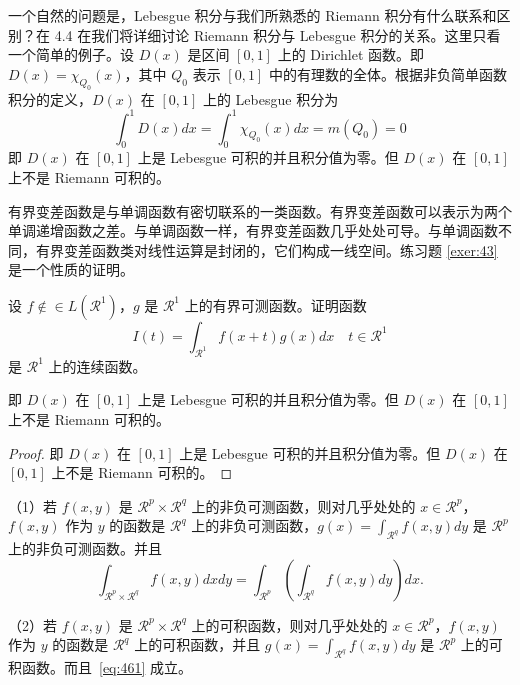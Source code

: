 \documentclass[lang=cn,newtx,10pt,scheme=chinese]{elegantbook}
\begin{document}
一个自然的问题是，Lebesgue 积分与我们所熟悉的 Riemann 积分有什么联系和区别？在 4.4 在我们将详细讨论 Riemann 积分与 Lebesgue 积分的关系。这里只看一个简单的例子。设 $D(x)$ 是区间 $[0,1]$ 上的 Dirichlet 函数。即 $D(x)=\chi_{Q_0}(x)$，其中 $Q_0$ 表示 $[0,1]$ 中的有理数的全体。根据非负简单函数积分的定义，$D(x)$ 在 $[0,1]$ 上的 Lebesgue 积分为
\begin{equation}
   \label{inter2}
   \int_0^1 D(x)dx = \int_0^1 \chi_{Q_0} (x) dx = m(Q_0) = 0
\end{equation}
即 $D(x)$ 在 $[0,1]$ 上是 Lebesgue 可积的并且积分值为零。但 $D(x)$ 在 $[0,1]$ 上不是 Riemann 可积的。


有界变差函数是与单调函数有密切联系的一类函数。有界变差函数可以表示为两个单调递增函数之差。与单调函数一样，有界变差函数几乎处处可导。与单调函数不同，有界变差函数类对线性运算是封闭的，它们构成一线空间。练习题 \ref{exer:43} 是一个性质的证明。

\begin{exercise}\label{exer:43}
设 $f \notin\in L(\mathcal{R}^1)$，$g$ 是 $\mathcal{R}^1$ 上的有界可测函数。证明函数
\begin{equation}
   \label{ex:1}
   I(t) = \int_{\mathcal{R}^1} f(x+t)g(x)dx \quad t \in \mathcal{R}^1
\end{equation}
是 $\mathcal{R}^1$ 上的连续函数。 
\end{exercise}

\begin{solution}
即 $D(x)$ 在 $[0,1]$ 上是 Lebesgue 可积的并且积分值为零。但 $D(x)$ 在 $[0,1]$ 上不是 Riemann 可积的。
\end{solution}

\begin{proof}
即 $D(x)$ 在 $[0,1]$ 上是 Lebesgue 可积的并且积分值为零。但 $D(x)$ 在 $[0,1]$ 上不是 Riemann 可积的。
\end{proof}

\begin{theorem}[Fubini 定理] \label{thm:fubi} 
（1）若 $f(x,y)$ 是 $\mathcal{R}^p\times\mathcal{R}^q$ 上的非负可测函数，则对几乎处处的 $x\in \mathcal{R}^p$，$f(x,y)$ 作为 $y$ 的函数是 $\mathcal{R}^q$ 上的非负可测函数，$g(x)=\int_{\mathcal{R}^q}f(x,y) dy$ 是 $\mathcal{R}^p$ 上的非负可测函数。并且
\begin{equation}
   \label{eq:461}
   \int_{\mathcal{R}^p\times\mathcal{R}^q} f(x,y) dxdy=\int_{\mathcal{R}^p}\left(\int_{\mathcal{R}^q}f(x,y)dy\right)dx.
\end{equation}

（2）若 $f(x,y)$ 是 $\mathcal{R}^p\times\mathcal{R}^q$ 上的可积函数，则对几乎处处的 $x\in\mathcal{R}^p$，$f(x,y)$ 作为 $y$ 的函数是 $\mathcal{R}^q$ 上的可积函数，并且 $g(x)=\int_{\mathcal{R}^q}f(x,y) dy$ 是 $\mathcal{R}^p$ 上的可积函数。而且~\eqref{eq:461} 成立。
\end{theorem}
\end{document}
